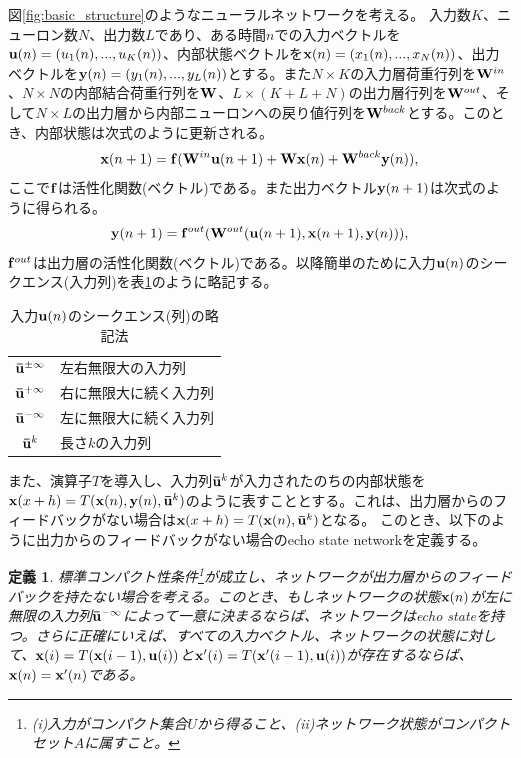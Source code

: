 \documentclass{jsarticle}
\newtheorem{dfn}{定義}
\begin{document}
図\ref{fig:basic_structure}のようなニューラルネットワークを考える。
入力数$K$、ニューロン数$N$、出力数$L$であり、ある時間$n$での入力ベクトルを${\bf u}(n) = (u_1(n),...,u_K(n))$、内部状態ベクトルを${\bf x}(n) = (x_1(n),...,x_N(n))$、出力ベクトルを${\bf y}(n) = (y_1(n),...,y_L(n))$とする。また$N\times K$の入力層荷重行列を${\bf W}^{in}$、$N\times N$の内部結合荷重行列を$\bf W$、$L\times (K+L+N)$の出力層行列を${\bf W}^{out}$、そして$N\times L$の出力層から内部ニューロンへの戻り値行列を${\bf W}^{back}$とする。このとき、内部状態は次式のように更新される。
\begin{equation}
	{\bf x}(n+1)={\bf f}({\bf W}^{in}{\bf u}(n+1)+{\bf W}{\bf x}(n)+{\bf W}^{back}{\bf y}(n)),
	\label{eq:increment_x}
\end{equation}
ここで$\bf f$は活性化関数(ベクトル)である。また出力ベクトル${\bf y}(n+1)$は次式のように得られる。
\begin{equation}
	{\bf y}(n+1)={\bf f}^{out}({\bf W}^{out}({\bf u}(n+1),{\bf x}(n+1),{\bf y}(n))),
	\label{eq:increment_y}
\end{equation}
${\bf f}^{out}$は出力層の活性化関数(ベクトル)である。以降簡単のために入力${\bf u}(n)$のシークエンス(入力列)を表\ref{tb:u_shorthand}のように略記する。
\begin{table}[htb]
\caption{入力${\bf u}(n)$のシークエンス(列)の略記法}
\centering
  \begin{tabular}{cl}
    ${\bf \bar u}^{\pm \infty}$ & 左右無限大の入力列\\
    ${\bf \bar u}^{+ \infty}$ & 右に無限大に続く入力列\\
    ${\bf \bar u}^{- \infty}$ & 左に無限大に続く入力列\\
    ${\bf \bar u}^{k}$ & 長さ$k$の入力列
  \end{tabular}
  \label{tb:u_shorthand}
\end{table}
また、演算子$T$を導入し、入力列${\bf \bar u}^{k}$が入力されたのちの内部状態を${\bf x}(x+h) = T({\bf x}(n),{\bf y}(n),{\bf \bar u}^{k})$のように表すこととする。これは、出力層からのフィードバックがない場合は${\bf x}(x+h) = T({\bf x}(n),{\bf \bar u}^{k})$となる。
このとき、以下のように出力からのフィードバックがない場合のecho state networkを定義する。
\begin{dfn}
標準コンパクト性条件\footnote{(i)入力がコンパクト集合$U$から得ること、(ii)ネットワーク状態がコンパクトセット$A$に属すこと。}が成立し、ネットワークが出力層からのフィードバックを持たない場合を考える。このとき、もしネットワークの状態${\bf x}(n)$が左に無限の入力列${\bf \bar u}^{- \infty}$によって一意に決まるならば、ネットワークはecho stateを持つ。さらに正確にいえば、すべての入力ベクトル、ネットワークの状態に対して、${\bf x}(i) = T({\bf x}(i-1),{\bf u}(i))$と${\bf x'}(i) = T({\bf x'}(i-1),{\bf u}(i))$が存在するならば、${\bf x}(n)={\bf x'}(n)$である。
\end{dfn}
\end{document}
